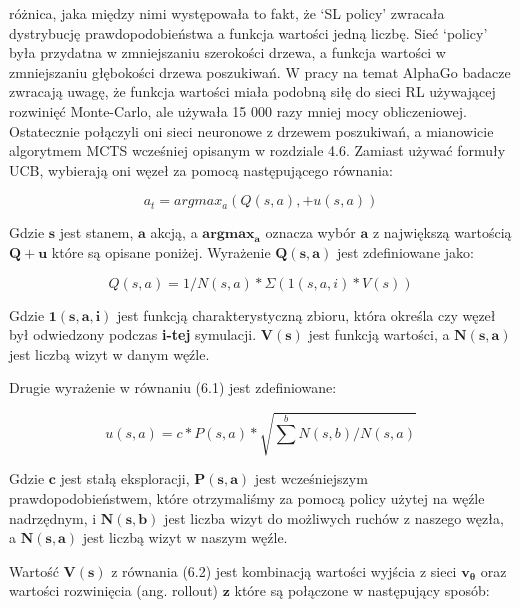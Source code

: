 różnica, jaka między nimi występowała to fakt, że ‘SL policy’ zwracała dystrybucję prawdopodobieństwa a funkcja wartości jedną liczbę. Sieć ‘policy’ była przydatna w zmniejszaniu szerokości drzewa, a funkcja wartości w zmniejszaniu głębokości drzewa poszukiwań. W pracy na temat AlphaGo badacze zwracają uwagę, że funkcja wartości miała podobną siłę do sieci RL używającej rozwinięć Monte-Carlo, ale używała 15 000 razy mniej mocy obliczeniowej. Ostatecznie połączyli oni sieci neuronowe z drzewem poszukiwań, a mianowicie algorytmem MCTS wcześniej opisanym w rozdziale 4.6. Zamiast używać formuły UCB, wybierają oni węzeł za pomocą następującego równania:

\begin{equation}
a_t = argmax_a(Q(s, a), + u(s, a))
\end{equation}

\noindent Gdzie $\boldsymbol{s}$ jest stanem, $\boldsymbol{a}$ akcją, a $\boldsymbol{argmax_a}$ oznacza wybór $\boldsymbol{a}$ z największą wartością $\boldsymbol{Q + u}$ które są opisane poniżej. Wyrażenie $\boldsymbol{Q(s, a)}$ jest zdefiniowane jako:

\begin{equation}
Q(s, a) = 1/N(s, a) * \Sigma(1(s, a, i) * V(s))
\end{equation}

\noindent Gdzie $\boldsymbol{1(s, a, i)}$ jest funkcją charakterystyczną zbioru, która określa czy węzeł był odwiedzony podczas \textbf{i-tej} symulacji. $\boldsymbol{V(s)}$ jest funkcją wartości, a $\boldsymbol{N(s, a)}$ jest liczbą wizyt w danym węźle.\newline

\noindent Drugie wyrażenie w równaniu (6.1) jest zdefiniowane:

\begin{equation}
u(s, a) = c * P(s, a) * \sqrt{\sum_{}^{b}N(s, b) / N(s, a)}
\end{equation}

\noindent Gdzie $\boldsymbol{c}$ jest stałą eksploracji, $\boldsymbol{P(s, a)}$ jest wcześniejszym prawdopodobieństwem, które otrzymaliśmy za pomocą policy użytej na węźle nadrzędnym, i $\boldsymbol{N(s, b)}$ jest liczba wizyt do możliwych ruchów z naszego węzła, a $\boldsymbol{N(s, a)}$ jest liczbą wizyt w naszym węźle.\newline

\noindent Wartość $\boldsymbol{V(s)}$ z równania (6.2) jest kombinacją wartości wyjścia z sieci $\boldsymbol{v_\theta}$ oraz wartości rozwinięcia (ang. rollout) $\boldsymbol{z}$ które są połączone w następujący sposób:


